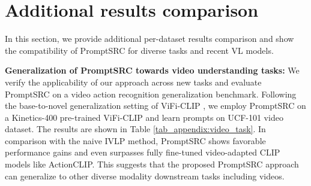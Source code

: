 \documentclass[10pt,twocolumn,letterpaper]{article}
\begin{document}
\section{Additional results comparison}
\label{appendix:base2novel_per_component_per_dataset}
In this section, we provide additional per-dataset results comparison and show the compatibility of PromptSRC for diverse tasks and recent VL models.


\noindent \textbf{{Generalization of PromptSRC towards video understanding tasks:}} We verify the applicability of our approach across new tasks and evaluate PromptSRC on a video action recognition generalization benchmark. Following the base-to-novel generalization setting of ViFi-CLIP \cite{rasheed2023fine}, we employ PromptSRC on a Kinetics-400 pre-trained ViFi-CLIP \cite{rasheed2023fine} and learn prompts on UCF-101 video dataset. The results are shown in Table \ref{tab_appendix:video_task}. In comparison with the naive IVLP method, PromptSRC shows favorable performance gains and even surpasses fully fine-tuned video-adapted CLIP models like ActionCLIP. This suggests that the proposed PromptSRC approach can generalize to other diverse modality downstream tasks including videos.
\end{document}
